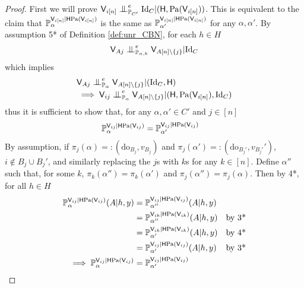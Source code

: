 \begin{proof}
First we will prove $\RV{V}_{i[n]}\CI^e_{\prob{P}_{C'}}\text{Id}_C|(\RV{H},\mathrm{Pa}(\RV{V}_{i [n]}))$. This is equivalent to the claim that $\mathbb{P}_\alpha^{\mathsf{V}_{i[n]}|\mathsf{H}\mathrm{Pa}(\mathsf{V}_{i[n]})}$ is the same as $\mathbb{P}_{\alpha'}^{\mathsf{V}_{i[n]}|\mathsf{H}\mathrm{Pa}(\mathsf{V}_{i[n]})}$ for any $\alpha,\alpha'$. By assumption 5* of Definition \ref{def:unr_CBN}, for each $h\in H$
\begin{align}
    \RV{V}_{Aj}\CI^e_{\prob{P}_{\alpha,h}} \RV{V}_{A [n]\setminus\{j\}} |\text{Id}_C
\end{align}
which implies
\begin{align}
    &\RV{V}_{Aj}\CI^e_{\prob{P}_{\alpha}} \RV{V}_{A [n]\setminus\{j\}} |(\text{Id}_C,\RV{H})\\
    &\implies \RV{V}_{ij}\CI^e_{\prob{P}_{\alpha}} \RV{V}_{A [n]\setminus\{j\}} |(\RV{H},\mathrm{Pa}(\RV{V}_{i[n]}),\text{Id}_C)\label{eqApp:mutual_conditional_independence}
\end{align}
thus it is sufficient to show that, for any $\alpha,\alpha'\in C'$ and $j\in[n]$
\begin{align}
    \mathbb{P}_\alpha^{\mathsf{V}_{ij}|\mathsf{H}\mathrm{Pa}(\mathsf{V}_{ij})} &= \mathbb{P}_{\alpha'}^{\mathsf{V}_{ij}|\mathsf{H}\mathrm{Pa}(\mathsf{V}_{ij})}
\end{align}
By assumption, if $\pi_j(\alpha) =: (\mathrm{do}_{B_j},v_{B_j})$ and $\pi_j(\alpha') =: (\mathrm{do}_{B_j'},v_{B_j'}')$, $i\not\in B_j\cup B_j'$, and similarly replacing the $j$s with $k$s for any $k\in [n]$. Define $\alpha''$ such that, for some $k$, $\pi_k(\alpha'')=\pi_k(\alpha')$ and $\pi_j(\alpha'')=\pi_j(\alpha)$. Then by 4*, for all $h\in H$
\begin{align}
    \mathbb{P}_{\alpha}^{\mathsf{V}_{ij}|\mathsf{H}\mathrm{Pa}(\mathsf{V}_{ij})}(A|h,y) &= \mathbb{P}_{\alpha''}^{\mathsf{V}_{ij}|\mathsf{H}\mathrm{Pa}(\mathsf{V}_{ij})}(A|h,y)\\
    &= \mathbb{P}_{\alpha''}^{\mathsf{V}_{ik}|\mathsf{H}\mathrm{Pa}(\mathsf{V}_{ik})}(A|h,y)&\text{by 3*}\\
    &= \mathbb{P}_{\alpha'}^{\mathsf{V}_{ik}|\mathsf{H}\mathrm{Pa}(\mathsf{V}_{ik})}(A|h,y)&\text{by 4*}\\
    &= \mathbb{P}_{\alpha'}^{\mathsf{V}_{ij}|\mathsf{H}\mathrm{Pa}(\mathsf{V}_{ij})}(A|h,y)&\text{by 3*}\\
    \implies \mathbb{P}_\alpha^{\mathsf{V}_{ij}|\mathsf{H}\mathrm{Pa}(\mathsf{V}_{ij})} &= \mathbb{P}_{\alpha'}^{\mathsf{V}_{ij}|\mathsf{H}\mathrm{Pa}(\mathsf{V}_{ij})}
\end{align}


\end{proof}
